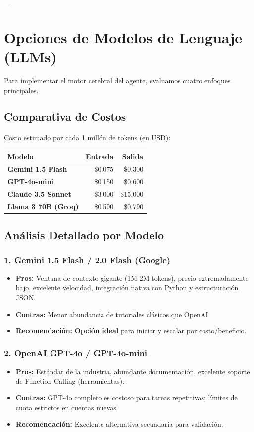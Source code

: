 \documentclass[11pt]{article}
\begin{document}
---

\section{Opciones de Modelos de Lenguaje (LLMs)}
Para implementar el motor cerebral del agente, evaluamos cuatro enfoques principales.

\subsection{Comparativa de Costos}
Costo estimado por cada 1 millón de tokens (en USD):

\vspace{0.5em}
\noindent
\begin{tabularx}{\linewidth}{X r r}
    \toprule
    \textbf{Modelo} & \textbf{Entrada} & \textbf{Salida} \\
    \midrule
    \textbf{Gemini 1.5 Flash} & \$0.075 & \$0.300 \\
    \textbf{GPT-4o-mini} & \$0.150 & \$0.600 \\
    \textbf{Claude 3.5 Sonnet} & \$3.000 & \$15.000 \\
    \textbf{Llama 3 70B (Groq)} & \$0.590 & \$0.790 \\
    \bottomrule
\end{tabularx}
\vspace{0.5em}

\subsection{Análisis Detallado por Modelo}

\subsubsection{1. Gemini 1.5 Flash / 2.0 Flash (Google)}
\begin{itemize}
    \item \textbf{Pros:} Ventana de contexto gigante (1M-2M tokens), precio extremadamente bajo, excelente velocidad, integración nativa con Python y estructuración JSON.
    \item \textbf{Contras:} Menor abundancia de tutoriales clásicos que OpenAI.
    \item \textbf{Recomendación:} \textbf{Opción ideal} para iniciar y escalar por costo/beneficio.
\end{itemize}

\subsubsection{2. OpenAI GPT-4o / GPT-4o-mini}
\begin{itemize}
    \item \textbf{Pros:} Estándar de la industria, abundante documentación, excelente soporte de Function Calling (herramientas).
    \item \textbf{Contras:} GPT-4o completo es costoso para tareas repetitivas; límites de cuota estrictos en cuentas nuevas.
    \item \textbf{Recomendación:} Excelente alternativa secundaria para validación.
\end{itemize}
\end{document}
